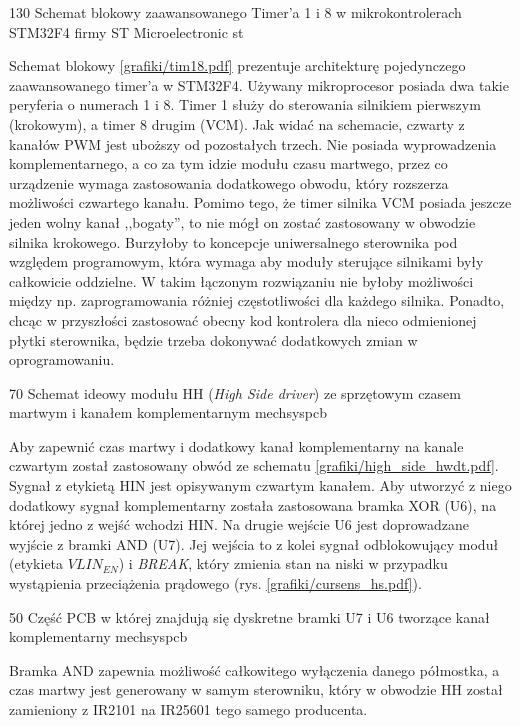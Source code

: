 	{130}
	{Schemat blokowy zaawansowanego Timer'a 1 i 8 w mikrokontrolerach STM32F4 firmy ST Microelectronic}
	{st}

Schemat blokowy \ref{grafiki/tim18.pdf} prezentuje architekturę pojedynczego zaawansowanego timer'a w STM32F4. Używany mikroprocesor posiada dwa takie peryferia o numerach 1 i 8. Timer 1 służy do sterowania silnikiem pierwszym (krokowym), a timer 8 drugim (VCM). Jak widać na schemacie, czwarty z kanałów PWM jest uboższy od pozostałych trzech. Nie posiada wyprowadzenia komplementarnego, a co za tym idzie modułu czasu martwego, przez co urządzenie wymaga zastosowania dodatkowego obwodu, który rozszerza możliwości czwartego kanału. Pomimo tego, że timer silnika VCM posiada jeszcze jeden wolny kanał ,,bogaty'', to nie mógł on zostać zastosowany w obwodzie silnika krokowego. Burzyłoby to koncepcje uniwersalnego sterownika pod względem programowym, która wymaga aby moduły sterujące silnikami były całkowicie oddzielne. W takim łączonym rozwiązaniu nie byłoby możliwości między np. zaprogramowania różniej częstotliwości dla każdego silnika. Ponadto, chcąc w przyszłości zastosować obecny kod kontrolera dla nieco odmienionej płytki sterownika, będzie trzeba dokonywać dodatkowych zmian w oprogramowaniu.

	{70}
	{Schemat ideowy modułu HH ({\it High Side driver}) ze sprzętowym czasem martwym i kanałem komplementarnym}
	{mechsyspcb}

Aby zapewnić czas martwy i dodatkowy kanał komplementarny na kanale czwartym został zastosowany obwód ze schematu \ref{grafiki/high_side_hwdt.pdf}. Sygnał z etykietą HIN jest opisywanym czwartym kanałem. Aby utworzyć z niego dodatkowy sygnał komplementarny została zastosowana bramka XOR (U6), na której jedno z wejść wchodzi HIN. Na drugie wejście U6 jest doprowadzane wyjście z bramki AND (U7). Jej wejścia to z kolei sygnał odblokowujący moduł (etykieta $ VLIN_{EN} $) i {\it BREAK}, który zmienia stan na niski w przypadku wystąpienia przeciążenia prądowego (rys. \ref{grafiki/cursens_hs.pdf}). 

	{50}
	{Część PCB w której znajdują się dyskretne bramki U7 i U6 tworzące kanał komplementarny}
	{mechsyspcb}
	
Bramka AND zapewnia możliwość całkowitego wyłączenia danego półmostka, a czas martwy jest generowany w samym sterowniku, który w obwodzie HH został zamieniony z IR2101 na IR25601 tego samego producenta. 

